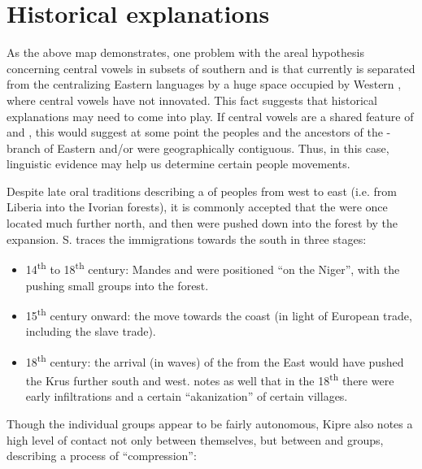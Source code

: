 \documentclass[output=paper,newtxmath,modfonts,nonflat]{langsci/langscibook}
\begin{document}
\section{Historical explanations}\label{sec:zogbo:6} 

As the above map demonstrates, one problem with the areal hypothesis concerning central vowels in subsets of southern  and  is that currently  is separated from the centralizing Eastern languages by a huge space occupied by Western , where central vowels have not innovated. This fact suggests that historical explanations may need to come into play. If central vowels are a shared feature of  and , this would suggest at some point the  peoples and the ancestors of the - branch of Eastern  and/or  were geographically contiguous. Thus, in this case, linguistic evidence may help us determine certain people movements.   

Despite late oral traditions describing a  of  peoples from west to east (i.e. from Liberia into the Ivorian forests), it is commonly accepted that the  were once located much further north, and then were pushed down into the forest by the  expansion. S. \citet{Lafage1983} traces the  immigrations towards the south in three stages:

\begin{itemize}
\item 14\textsuperscript{th} to 18\textsuperscript{th} century: Mandes and  were positioned “on the Niger”, with the  pushing small  groups into the forest.\\[-0.75cm] 
\item 15\textsuperscript{th} century onward: the  move towards the coast (in light of European trade, including the slave trade). \\[-0.75cm]
\item 18\textsuperscript{th} century: the arrival (in waves) of the  from the East would have pushed the Krus further south and west. \citet[68]{kipre2005} notes as well that in the 18\textsuperscript{th} there were early  infiltrations and a certain “akanization” of certain  villages.
\end{itemize}

Though the individual  groups appear to be fairly autonomous, Kipre also notes a high level of contact not only between  themselves, but between  and  groups, describing a process of ``compression'': 
\end{document}
